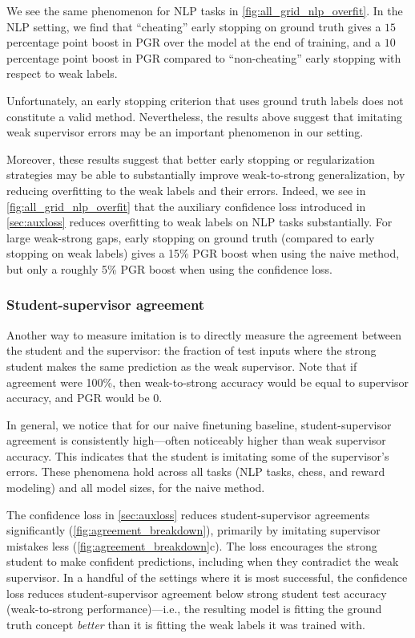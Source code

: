 We see the same phenomenon for NLP tasks in \ref{fig:all_grid_nlp_overfit}. 
In the NLP setting, we find that ``cheating'' early stopping on ground truth gives a $15$ percentage point boost in PGR over the model at the end of training, and a $10$ percentage point boost in PGR compared to ``non-cheating'' early stopping with respect to weak labels. 

Unfortunately, an early stopping criterion that uses ground truth labels does not constitute a valid method. Nevertheless, the results above suggest that imitating weak supervisor errors may be an important phenomenon in our setting.

Moreover, these results suggest that better early stopping or regularization strategies may be able to substantially improve weak-to-strong generalization, by reducing overfitting to the weak labels and their errors. Indeed, we see in \ref{fig:all_grid_nlp_overfit} that the auxiliary confidence loss introduced in \ref{sec:auxloss} reduces overfitting to weak labels on NLP tasks substantially. For large weak-strong gaps, early stopping on ground truth (compared to early stopping on weak labels) gives a 15\% PGR boost when using the naive method, but only a roughly 5\% PGR boost when using the confidence loss. 

\subsubsection{Student-supervisor agreement}

Another way to measure imitation is to directly measure the agreement between the student and the supervisor: the fraction of test inputs where the strong student makes the same prediction as the weak supervisor.  Note that if agreement were 100\%, then weak-to-strong accuracy would be equal to supervisor accuracy, and PGR would be 0.  

In general, we notice that for our naive finetuning baseline, student-supervisor agreement is consistently high---often noticeably higher than weak supervisor accuracy. This indicates that the student is imitating some of the supervisor's errors. These phenomena hold across all tasks (NLP tasks, chess, and reward modeling) and all model sizes, for the naive method. 

The confidence loss in \ref{sec:auxloss} reduces student-supervisor agreements significantly (\ref{fig:agreement_breakdown}), primarily by imitating supervisor mistakes less (\ref{fig:agreement_breakdown}c).
The loss encourages the strong student to make confident predictions, including when they contradict the weak supervisor. In a handful of the settings where it is most successful, the confidence loss reduces student-supervisor agreement below strong student test accuracy (weak-to-strong performance)---i.e., the resulting model is fitting the ground truth concept \textit{better} than it is fitting the weak labels it was trained with.


